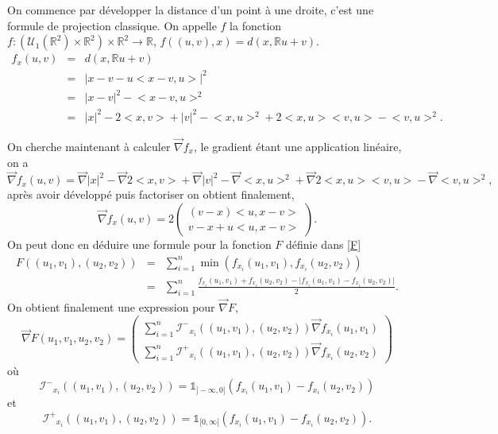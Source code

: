 \documentclass[a4paper,11pt]{article}
\begin{document}
On commence par développer la distance d'un point à une droite, c'est une formule de projection classique. On appelle $f$ la fonction $f:(\mathcal{U}_1(\mathbb{R}^2)\times\mathbb{R}^2) \times \mathbb{R}^2 \to \mathbb{R}$, $f((u,v),x)=d(x,\mathbb{R}u+v)$.
\begin{equation}
	\begin{array}{ccc}
		f_x(u,v)&=&d(x,\mathbb{R}u+v)\\
		&=& \big|x-v-u\big<x-v , u\big> \big|^2\\
		&=& \big|x-v\big|^2 -\big<x-v, u\big>^2\\
		&=& \big|x\big|^2-2\big<x,v\big>+\big|v\big|^2 -\big<x, u\big>^2+ 2\big<x, u\big>\big<v, u\big>- \big<v, u\big>^2.
	\end{array}
\end{equation}

On cherche maintenant à calculer $\overrightarrow{\nabla} f_x$, le gradient étant une application linéaire, on a  
\[\overrightarrow{\nabla} f_x (u,v)= \overrightarrow{\nabla}\big|x\big|^2-\overrightarrow{\nabla}2\big<x,v\big>+\overrightarrow{\nabla}\big|v\big|^2 -\overrightarrow{\nabla}\big<x, u\big>^2+ \overrightarrow{\nabla}2\big<x, u\big>\big<v, u\big>- \overrightarrow{\nabla}\big<v, u\big>^2,\]
après avoir développé puis factoriser on obtient finalement, 
\begin{equation}
	\overrightarrow{\nabla} f_x (u,v)=2
	\begin{pmatrix}
		(v-x)\big<u,x-v\big>\\
		v-x+u\big<u,x-v\big>
	\end{pmatrix}.
\end{equation}
On peut donc en déduire une formule pour la fonction $F$ définie dans \eqref{F}
\begin{equation}
	\begin{array}{ccc}
		F((u_1,v_1), (u_2,v_2))&=& \sum_{i=1}^{n}\min (f_{x_i}(u_1,v_1) ,f_{x_i}(u_2,v_2) )\\
		&=& \sum_{i=1}^{n} \frac{f_{x_i}(u_1,v_1)+f_{x_i}(u_2,v_2) -\big|f_{x_i}(u_1,v_1)- f_{x_i}(u_2,v_2) \big| }{2}.
	\end{array}
\end{equation}
On obtient finalement une expression pour $\overrightarrow{\nabla} F$, 
\begin{equation}
	\overrightarrow{\nabla} F(u_1,v_1, u_2,v_2)=
	\begin{pmatrix}
		\sum_{i=1}^{n}\mathcal{I^{-}}_{x_i}((u_1,v_1),(u_2,v_2))\overrightarrow{\nabla}f_{x_i} (u_1,v_1)\\
		\sum_{i=1}^{n}\mathcal{I^{+}}_{x_i}((u_1,v_1),(u_2,v_2))\overrightarrow{\nabla}f_{x_i} (u_2,v_2)
	\end{pmatrix}
\end{equation}
où \[\mathcal{I^{-}}_{x_i}((u_1,v_1),(u_2,v_2))=\mathds{1}_{]-\infty,0]}(f_{x_i}(u_1,v_1)- f_{x_i}(u_2,v_2))\] et \[\mathcal{I^{+}}_{x_i}((u_1,v_1),(u_2,v_2))=\mathds{1}_{[0,\infty[}(f_{x_i}(u_1,v_1)- f_{x_i}(u_2,v_2)).\]
\end{document}
